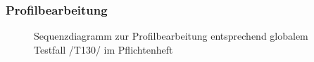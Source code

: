 \subsubsection{Profilbearbeitung}
\begin{figure}[H]
\centering
{}
\caption{Sequenzdiagramm zur Profilbearbeitung entsprechend globalem Testfall /T130/ im Pflichtenheft}
\end{figure}


